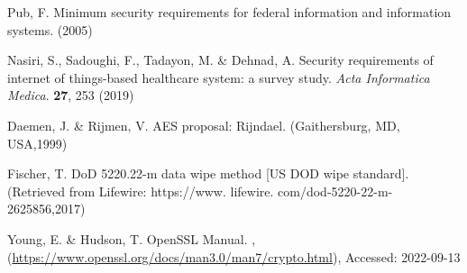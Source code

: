 Pub, F. Minimum security requirements for federal information and information systems.  (2005)

Nasiri, S., Sadoughi, F., Tadayon, M. \& Dehnad, A. Security requirements of internet of things-based healthcare system: a survey study. {\em Acta Informatica Medica}. \textbf{27}, 253 (2019)

Daemen, J. \& Rijmen, V. AES proposal: Rijndael. (Gaithersburg, MD, USA,1999)

Fischer, T. DoD 5220.22-m data wipe method [US DOD wipe standard]. (Retrieved from Lifewire: https://www. lifewire. com/dod-5220-22-m-2625856,2017)

Young, E. \& Hudson, T. OpenSSL Manual. , (\url{https://www.openssl.org/docs/man3.0/man7/crypto.html}), Accessed: 2022-09-13
